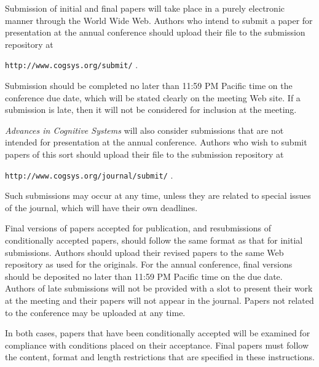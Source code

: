 \documentclass[11pt,letterpaper]{article}
\begin{document}
Submission of initial and final papers will take place in a purely
electronic manner through the World Wide Web. Authors who intend to
submit a paper for presentation at the annual conference should upload
their file to the submission repository at
\vskip 0.1in
\begin{small}
\centerline{{\tt http://www.cogsys.org/submit/} .}
\end{small}
\vskip 0.12in
\noindent
Submission should be completed no later than 11:59 PM Pacific time 
on the conference due date, which will be stated clearly on the 
meeting Web site. If a submission is late, then it will not be 
considered for inclusion at the meeting.

{\it Advances in Cognitive Systems\/} will also consider submissions
that are not intended for presentation at the annual conference. 
Authors who wish to submit papers of this sort should upload their
file to the submission repository at
\vskip 0.1in
\begin{small}
\centerline{{\tt http://www.cogsys.org/journal/submit/} .}
\end{small}
\vskip 0.08in
\noindent
Such submissions may occur at any time, unless they are related to 
special issues of the journal, which will have their own deadlines. 


Final versions of papers accepted for publication, and resubmissions 
of conditionally accepted papers, should follow the same format 
as that for initial submissions. Authors should upload their revised 
papers to the same Web repository as used for the originals. 
For the annual conference, final versions should be deposited no 
later than 11:59 PM Pacific time on the due date. Authors of late 
submissions will not be provided with a slot to present their work 
at the meeting and their papers will not appear in the journal.
Papers not related to the conference may be uploaded at any time. 

In both cases, papers that have been conditionally accepted will be
examined for compliance with conditions placed on their acceptance. 
Final papers must follow the content, format and length restrictions 
that are specified in these instructions.

 
\end{document}
